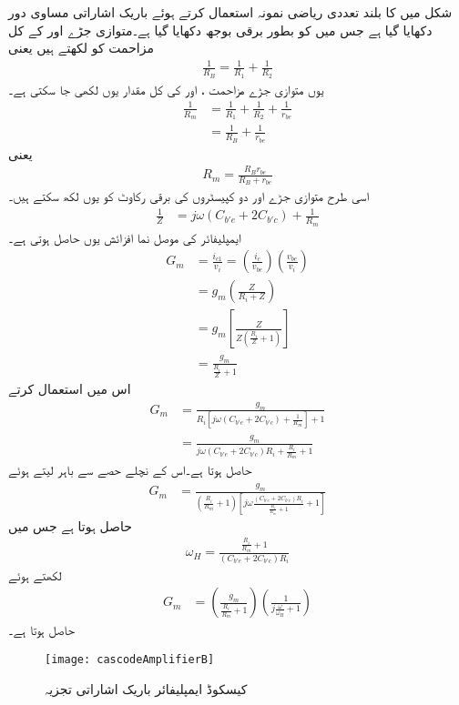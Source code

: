 شکل  میں  کا بلند تعددی ریاضی نمونہ استعمال کرتے  ہوئے باریک اشاراتی مساوی دور دکھایا گیا ہے جس میں  کو بطور برقی بوجھ دکھایا گیا ہے۔متوازی جڑے  اور  کے کل مزاحمت کو  لکھتے  ہیں یعنی
\begin{align*}
\frac{1}{R_B}=\frac{1}{R_1}+\frac{1}{R_2}
\end{align*}
یوں متوازی جڑے مزاحمت ،  اور  کی کل مقدار  یوں لکھی جا سکتی ہے۔
\begin{align*}
\frac{1}{R_m}&=\frac{1}{R_1}+\frac{1}{R_2}+\frac{1}{r_{be}}\\
&=\frac{1}{R_B}+\frac{1}{r_{be}}
\end{align*}
یعنی
\begin{align*}
R_m=\frac{R_B r_{be}}{R_B+r_{be}}
\end{align*}
اسی طرح متوازی جڑے  اور دو کپیسٹروں کی برقی رکاوٹ  کو یوں لکھ سکتے ہیں۔
\begin{align*}
\frac{1}{Z}&=j \omega \left( C_{b'e}+2 C_{b'c} \right)+\frac{1}{R_m}
\end{align*}
 ایمپلیفائر کی موصل نما افزائش  یوں حاصل ہوتی ہے۔
\begin{align*}
G_m&=\frac{i_{c1}}{v_i}=\left(\frac{i_c}{v_{be}} \right) \left(\frac{v_{be}}{v_i} \right)\\
&=g_m \left(\frac{Z}{R_i+Z} \right)\\
&=g_m \left[\frac{Z}{Z\left( \frac{R_i}{Z}+1\right)} \right]\\
&=\frac{g_m}{ \frac{R_i}{Z}+1}
\end{align*}
اس میں  استعمال کرتے 
\begin{align*}
G_m &= \frac{g_m}{ R_i \left[j \omega \left( C_{b'e}+2 C_{b'c} \right) +\frac{1}{R_m} \right]+1}\\
&=\frac{g_m}{ j \omega \left( C_{b'e}+2 C_{b'c} \right) R_i+\frac{R_i}{R_m} +1}
\end{align*}
حاصل ہوتا ہے۔اس کے نچلے  حصے سے  باہر لیتے ہوئے
\begin{align*}
G_m &=\frac{g_m}{ \left(\frac{R_i}{R_m}+1 \right) \left[j \omega \frac{\left( C_{b'e}+2 C_{b'c} \right)  R_i}{\frac{R_i}{R_m}+1}+1 \right]}
\end{align*}
حاصل ہوتا ہے جس میں
\begin{align}
\omega_H= \frac{\frac{R_i}{R_m}+1}{\left( C_{b'e}+2 C_{b'c} \right)  R_i}
\end{align}
لکھتے ہوئے
\begin{align}
G_m &=\left(\frac{g_m}{\frac{R_i}{R_m}+1} \right) \left(\frac{1}{j \frac{\omega}{\omega_H} +1}\right)
\end{align}
حاصل ہوتا ہے۔
\begin{figure}
\centering
\texttt{[image: cascodeAmplifierB]}
\caption{کیسکوڈ ایمپلیفائر باریک اشاراتی تجزیہ}
\label{شکل_تعددی_ردعمل_کیسکوڈ_ایمپلیفائر_باریک_اشاراتی_تجزیہ}
\end{figure}

